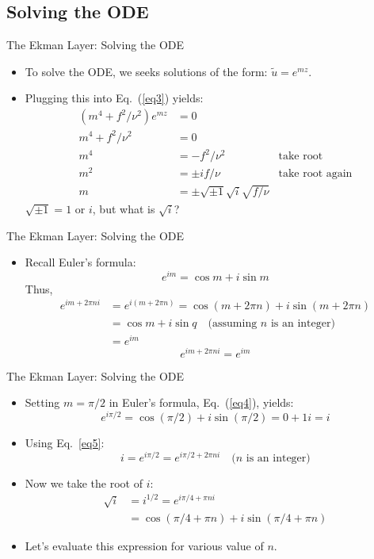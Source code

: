 \subsection{Solving the ODE}
\begin{frame}{The Ekman Layer: Solving the ODE}

\begin{itemize}
	\item To solve the ODE, we seeks solutions of the form: $\tilde u = e^{mz}$.
	\item Plugging this into Eq.~(\ref{eq3}) yields:
	\begin{align*}
	\left(m^4 + f^2/\nu^2\right)e^{mz} &= 0\\
	m^4 + f^2/\nu^2 &=0\\
	m^4 &= -f^2/\nu^2 \quad &\text{take root}\\
	m^2 &= \pm if/\nu \quad &\text{take root again}\\
	m&= \pm \sqrt{\pm 1} \sqrt{i} \sqrt{f/\nu}
	\end{align*}
	$\sqrt{\pm 1} = 1$ or $i$, but what is $\sqrt{i}$?
\end{itemize}
\end{frame}
\begin{frame}{The Ekman Layer: Solving the ODE}

\begin{itemize}
	\item Recall Euler's formula:
	\begin{equation}
		\boxed{e^{im} = \cos m + i \sin m}
		\label{eq4}
	\end{equation}
	Thus,
	\begin{align*}
	e^{im + 2\pi n i} &= e^{i(m+2\pi n)} = \cos{(m + 2\pi n)} + i\sin{(m+2\pi n)}\\
	&= \cos m + i\sin q \quad \text{(assuming $n$ is an integer)}\\
	&= e^{im}
	\end{align*}
	\begin{equation}
		\boxed{e^{im + 2\pi n i} = e^{im}}
		\label{eq5}
	\end{equation}
\end{itemize}
\end{frame}
\begin{frame}{The Ekman Layer: Solving the ODE}

\begin{itemize}
	\item Setting $m=\pi/2$ in Euler's formula, Eq.~(\ref{eq4}), yields:
	$$e^{i\pi/2} = \cos{(\pi/2)} + i\sin{(\pi/2)} = 0 + 1i = i$$
	\item Using Eq.~\ref{eq5}:
	$$i = e^{i\pi/2} = e^{i\pi/2 + 2\pi n i} \quad \text{($n$ is an integer)}$$
	\item Now we take the root of $i$:
	\begin{align*}
	\sqrt{i} &= i^{1/2} = e^{i\pi/4 + \pi n i}\\
	&= \cos{(\pi/4 + \pi n)} + i\sin{(\pi/4 + \pi n)}	
	\end{align*}
	\item Let's evaluate this expression for various value of $n$.
\end{itemize}
\end{frame}
